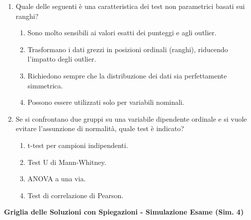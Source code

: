 \documentclass[12pt, a4paper]{article}
\begin{document}
\begin{enumerate}[resume]
    \item Quale delle seguenti è una caratteristica dei test non parametrici basati sui ranghi?
    \begin{enumerate}
        \item Sono molto sensibili ai valori esatti dei punteggi e agli outlier.
        \item Trasformano i dati grezzi in posizioni ordinali (ranghi), riducendo l'impatto degli outlier.
        \item Richiedono sempre che la distribuzione dei dati sia perfettamente simmetrica.
        \item Possono essere utilizzati solo per variabili nominali.
    \end{enumerate}
    \vspace{0.3cm}

    \item Se si confrontano due gruppi su una variabile dipendente ordinale e si vuole evitare l'assunzione di normalità, quale test è indicato?
    \begin{enumerate}
        \item t-test per campioni indipendenti.
        \item Test U di Mann-Whitney.
        \item ANOVA a una via.
        \item Test di correlazione di Pearson.
    \end{enumerate}
    \vspace{0.3cm}
\end{enumerate}

\newpage
\begin{center}
    \Large\textbf{Griglia delle Soluzioni con Spiegazioni - Simulazione Esame (Sim. 4)}
\end{center}
\vspace{1cm}
\end{document}
